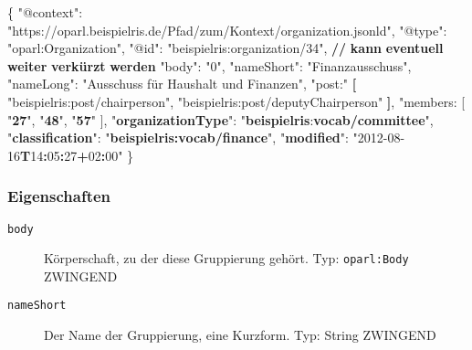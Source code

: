 \documentclass[,a4paper]{article}
\newenvironment{Shaded}{}{}
\newcommand{\DataTypeTok}[1]{\textcolor[rgb]{0.56,0.13,0.00}{{#1}}}
\newcommand{\DecValTok}[1]{\textcolor[rgb]{0.25,0.63,0.44}{{#1}}}
\newcommand{\StringTok}[1]{\textcolor[rgb]{0.25,0.44,0.63}{{#1}}}
\newcommand{\FunctionTok}[1]{\textcolor[rgb]{0.02,0.16,0.49}{{#1}}}
\newcommand{\ErrorTok}[1]{\textcolor[rgb]{1.00,0.00,0.00}{\textbf{{#1}}}}
\begin{document}
\begin{Shaded}
\begin{Highlighting}[]
\FunctionTok{\{}
    \DataTypeTok{"@context"}\FunctionTok{:} \StringTok{"https://oparl.beispielris.de/Pfad/zum/Kontext/organization.jsonld"}\FunctionTok{,}
    \DataTypeTok{"@type"}\FunctionTok{:} \StringTok{"oparl:Organization"}\FunctionTok{,}
    \DataTypeTok{"@id"}\FunctionTok{:} \StringTok{"beispielris:organization/34"}\FunctionTok{,}
      \ErrorTok{//} \ErrorTok{kann} \ErrorTok{eventuell} \ErrorTok{weiter} \ErrorTok{verkürzt} \ErrorTok{werden}
    \DataTypeTok{"body"}\FunctionTok{:} \StringTok{"0"}\FunctionTok{,}
    \DataTypeTok{"nameShort"}\FunctionTok{:} \StringTok{"Finanzausschuss"}\FunctionTok{,}
    \DataTypeTok{"nameLong"}\FunctionTok{:} \StringTok{"Ausschuss für Haushalt und Finanzen"}\FunctionTok{,}
    \DataTypeTok{"post:"} \ErrorTok{[}
        \DataTypeTok{"beispielris:post/chairperson"}\FunctionTok{,}
        \DataTypeTok{"beispielris:post/deputyChairperson"}
    \ErrorTok{]}\FunctionTok{,}
    \DataTypeTok{"members: [}
\DataTypeTok{        "}\ErrorTok{27}\DataTypeTok{",}
\DataTypeTok{        "}\ErrorTok{48}\DataTypeTok{",}
\DataTypeTok{        "}\ErrorTok{57}\DataTypeTok{"}
\DataTypeTok{    ],}
\DataTypeTok{    "}\ErrorTok{organizationType}\DataTypeTok{": "}\ErrorTok{beispielris}\FunctionTok{:}\ErrorTok{vocab/committee}\StringTok{",}
\StringTok{    "}\ErrorTok{classification}\StringTok{": "}\ErrorTok{beispielris:vocab/finance}\StringTok{",}
\StringTok{    "}\ErrorTok{modified}\StringTok{": "}\DecValTok{2012-08-16}\ErrorTok{T}\DecValTok{14}\ErrorTok{:}\DecValTok{05}\ErrorTok{:}\DecValTok{27}\ErrorTok{+}\DecValTok{02}\ErrorTok{:}\DecValTok{00}\StringTok{"}
\StringTok{\}}
\end{Highlighting}
\end{Shaded}

\subsubsection{Eigenschaften}\label{eigenschaften-2}

\begin{description}
\item[\texttt{body}]
Körperschaft, zu der diese Gruppierung gehört. Typ: \texttt{oparl:Body}
ZWINGEND
\item[\texttt{nameShort}]
Der Name der Gruppierung, eine Kurzform. Typ: String ZWINGEND
\end{description}
\end{document}
